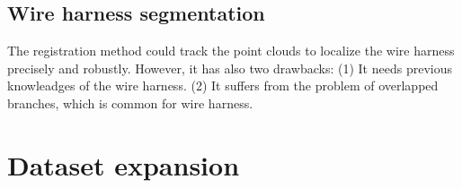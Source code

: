 \subsection{Wire harness segmentation}
    The registration method could track the point clouds to localize the wire harness precisely and robustly. However, it has also two drawbacks: (1) It needs previous knowleadges of the 
    wire harness. (2) It suffers from the problem of overlapped branches, which is common for wire harness. 
\section{Dataset expansion}

